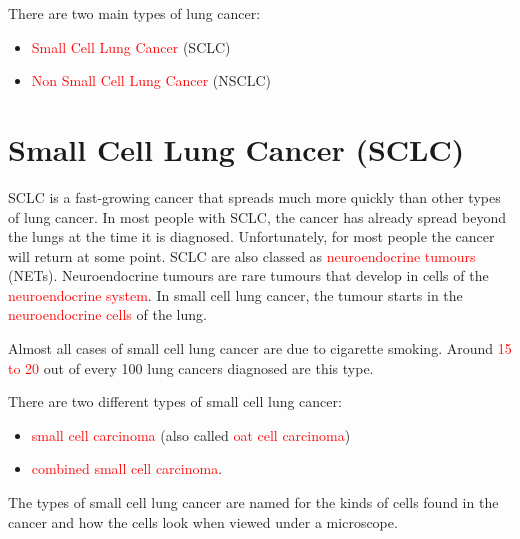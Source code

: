 There are two main types of lung cancer:
\begin{outline}
\begin{itemize}
    \item \textcolor{red}{Small Cell Lung Cancer} (SCLC)
    \item \textcolor{red}{Non Small Cell Lung Cancer} (NSCLC)    
\end{itemize}
\end{outline}
\section {Small Cell Lung Cancer (SCLC)}

SCLC is a fast-growing cancer that spreads much more quickly than other types of lung cancer. In most people with SCLC, the cancer has already spread beyond the lungs at the time it is diagnosed. Unfortunately, for most people the cancer will return at some point. SCLC are also classed as \textcolor{red}{neuroendocrine tumours} (NETs). \cite{jin2024single} Neuroendocrine tumours are rare tumours that develop in cells of the \textcolor{red}{neuroendocrine system}. In small cell lung cancer, the tumour starts in the \textcolor{red}{neuroendocrine cells} of the lung.

\begin{remark}
Almost all cases of small cell lung cancer are due to cigarette smoking. Around \textcolor{red}{15 to 20} out of every 100 lung cancers diagnosed are this type. 
\end{remark}

There are two different types of small cell lung cancer:
\begin{outline}
\begin{itemize}
    \item \textcolor{red}{small cell carcinoma} (also called \textcolor{red}{oat cell carcinoma})
    \item \textcolor{red}{combined small cell carcinoma}.
\end{itemize}
\end{outline}
\begin{remark}
The types of small cell lung cancer are named for the kinds of cells found in the cancer and how the cells look when viewed under a microscope. 
\end{remark}

